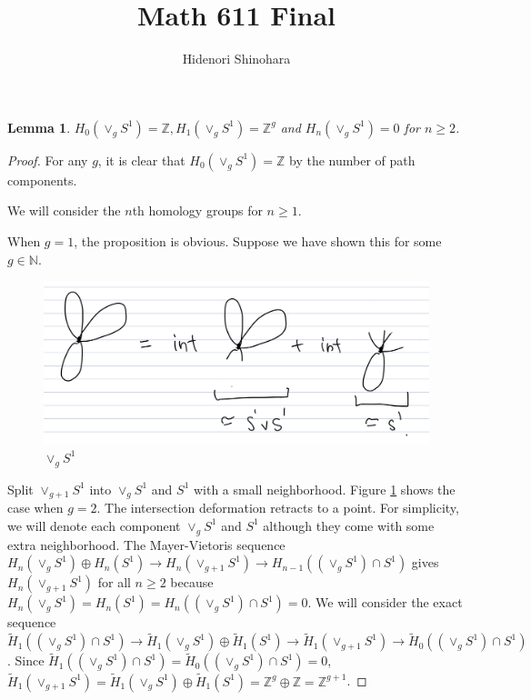 \documentclass[12pt, psamsfonts]{amsart}
\newtheorem{lem}[thm]{Lemma}
\theoremstyle{definition}
\theoremstyle{remark}
\numberwithin{equation}{section}
\begin{document}
\title{Math 611 Final}
\author{Hidenori Shinohara}
\maketitle

\begin{lem}\label{lemma:g}
  $H_0(\vee_g S^1) = \mathbb{Z}, H_1(\vee_g S^1) = \mathbb{Z}^g$ and $H_n(\vee_g S^1) = 0$ for $n \geq 2$.
\end{lem}

\begin{proof}
  For any $g$, it is clear that $H_0(\vee_g S^1) = \mathbb{Z}$ by the number of path components.

  We will consider the $n$th homology groups for $n \geq 1$.

  When $g = 1$, the proposition is obvious.
  Suppose we have shown this for some $g \in \mathbb{N}$.
  \begin{figure}[!htb]
    \includegraphics[width=.5\linewidth]{lemmasg.jpeg}
    \caption{$\vee_g S^1$}
    \label{fig:lemsg}
  \end{figure}
  Split $\vee_{g + 1} S^1$ into $\vee_g S^1$ and $S^1$ with a small neighborhood.
  Figure \ref{fig:lemsg} shows the case when $g = 2$.
  The intersection deformation retracts to a point.
  For simplicity, we will denote each component $\vee_g S^1$ and $S^1$ although they come with some extra neighborhood.
  The Mayer-Vietoris sequence $H_n(\vee_g S^1) \oplus H_n(S^1) \rightarrow H_n(\vee_{g + 1} S^1) \rightarrow H_{n - 1}((\vee_g S^1) \cap S^1)$ gives $H_n(\vee_{g + 1}S^1)$ for all $n \geq 2$ because $H_n(\vee_g S^1) = H_n(S^1) = H_n((\vee_g S^1) \cap S^1) = 0$.
  We will consider the exact sequence $\tilde{H}_1((\vee_g S^1) \cap S^1) \rightarrow \tilde{H}_1(\vee_g S^1) \oplus \tilde{H}_1(S^1) \rightarrow \tilde{H}_1(\vee_{g + 1} S^1) \rightarrow \tilde{H}_0((\vee_g S^1) \cap S^1)$.
  Since $\tilde{H}_1((\vee_g S^1) \cap S^1) = \tilde{H}_0((\vee_g S^1) \cap S^1) = 0$, 
  $\tilde{H}_1(\vee_{g + 1} S^1) = \tilde{H}_1(\vee_g S^1) \oplus \tilde{H}_1(S^1) = \mathbb{Z}^g \oplus \mathbb{Z} = \mathbb{Z}^{g + 1}$.
\end{proof}
\end{document}

